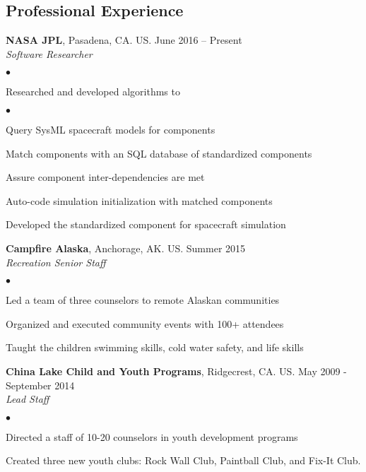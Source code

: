 \documentclass[margin,line]{res}
\newenvironment{list2}{
  \begin{list}{$\bullet$}{%
      \setlength{\itemsep}{0in}
      \setlength{\parsep}{0in} \setlength{\parskip}{0in}
      \setlength{\topsep}{0in} \setlength{\partopsep}{0in}
      \setlength{\leftmargin}{0.2in}}}{\end{list}}
\begin{document}
\begin{resume}
\section{\sc Professional Experience}
{\bf NASA JPL}, Pasadena, CA. US. \hfill{June 2016 -- Present}\\
{\em Software Researcher}\hfill 
\begin{list2} %
\item Researched and developed algorithms to
\begin{list2}
\item Query SysML spacecraft models for components
\item Match components with an SQL database of standardized components
\item Assure component inter-dependencies are met
\item Auto-code simulation initialization with matched components
\end{list2}
\item Developed the standardized component for spacecraft simulation
\end{list2}

{\bf Campfire Alaska}, Anchorage, AK. US. \hfill{Summer 2015}\\
{\em Recreation Senior Staff}\hfill 
\begin{list2} %
\item Led a team of three counselors to remote Alaskan communities  
\item Organized and executed community events with 100+ attendees 
\item Taught the children swimming skills, cold water safety, and life skills 
\end{list2}


{\bf China Lake Child and Youth Programs}, Ridgecrest, CA. US. \hfill{May 2009 - September 2014}\\
{\em Lead Staff}\hfill 
\begin{list2} %
\item Directed a staff of 10-20 counselors in youth development programs
\item Created three new youth clubs: Rock Wall Club, Paintball Club, and Fix-It Club. 
\end{list2}

\end{resume}
\end{document}
